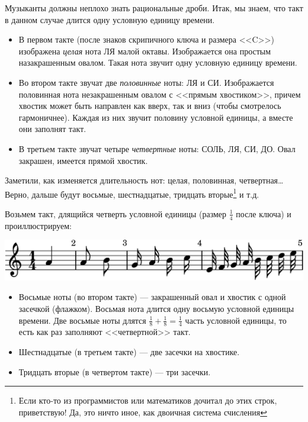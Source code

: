 Музыканты должны неплохо знать рациональные дроби. Итак, мы знаем, что такт в данном случае длится одну условную единицу времени.
\begin{itemize}
    \item В первом такте (после знаков скрипичного ключа и размера <<C>>) изображена \emph{целая} нота ЛЯ малой октавы. Изображается она простым назакрашенным овалом. Такая нота звучит одну условную единицу времени. 
    
    \item Во втором такте звучат две \emph{половинные} ноты: ЛЯ и СИ. Изображается половинная нота незакрашенным овалом с <<прямым хвостиком>>, причем хвостик может быть направлен как вверх, так и вниз (чтобы смотрелось гармоничнее). Каждая из них звучит половину условной единицы, а вместе они заполнят такт.
    
    \item В третьем такте звучат четыре \emph{четвертные} ноты: СОЛЬ, ЛЯ, СИ, ДО. Овал закрашен, имеется прямой хвостик.
\end{itemize}

Заметили, как изменяется длительность нот: целая, половинная, четвертная\ldots Верно, дальше будут восьмые, шестнадцатые, тридцать вторые\footnote{Если кто-то из программистов или математиков дочитал до этих строк, приветствую! Да, это ничто иное, как двоичная система счисления} и т.д.

Возьмем такт, длящийся четверть условной единицы (размер $\frac{1}{4}$ после ключа) и проиллюстрируем: 
\begin{center}    
    \includegraphics{fig/notes/time-1-4-beam-off}
\end{center}

\begin{itemize}
    \item Восьмые ноты (во втором такте) --- закрашенный овал и хвостик с одной засечкой (флажком). Восьмая нота длится одну восьмую условной единицы времени. Две восьмые ноты длятся $\frac{1}{8} + \frac{1}{8} = \frac{1}{4}$ часть условной единицы, то есть как раз заполняют <<четвертной>> такт.
    \item Шестнадцатые (в третьем такте) --- две засечки на хвостике.
    \item Тридцать вторые (в четвертом такте) --- три засечки.
\end{itemize}

